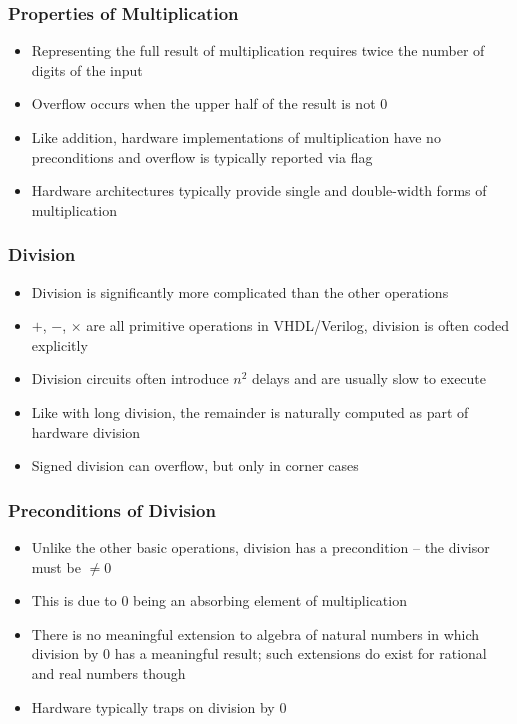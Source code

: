 \documentclass[aspectratio=169]{beamer}
\newif\iftransitions
\begin{document}
\begin{frame}
  \frametitle{Properties of Multiplication}
  
  \begin{itemize}
  \item Representing the full result of multiplication requires twice the number of digits of the input  \iftransitions \pause \fi 
  \item Overflow occurs when the upper half of the result is not $0$  \iftransitions \pause \fi 
  \item Like addition, hardware implementations of multiplication have no preconditions and overflow is typically reported via flag  \iftransitions \pause \fi 
  \item Hardware architectures typically provide single and double-width forms of multiplication
  \end{itemize}
\end{frame}

\begin{frame}
  \frametitle{Division}
  
  \begin{itemize}
  \item Division is significantly more complicated than the other operations  \iftransitions \pause \fi 
  \item $+$, $-$, $\times$ are all primitive operations in VHDL/Verilog, division is often coded explicitly  \iftransitions \pause \fi 
  \item Division circuits often introduce $n^2$ delays and are usually slow to execute  \iftransitions \pause \fi 
  \item Like with long division, the remainder is naturally computed as part of hardware division  \iftransitions \pause \fi 
  \item Signed division can overflow, but only in corner cases
  \end{itemize}
\end{frame}

\begin{frame}
  \frametitle{Preconditions of Division}
  
  \begin{itemize}
  \item Unlike the other basic operations, division has a precondition -- the divisor must be $\neq 0$  \iftransitions \pause \fi 
  \item This is due to $0$ being an absorbing element of multiplication  \iftransitions \pause \fi 
  \item There is no meaningful extension to algebra of natural numbers in which division by 0 has a meaningful result; such extensions do exist for rational and real numbers though  \iftransitions \pause \fi 
  \item Hardware typically traps on division by 0
  \end{itemize}
\end{frame}
\end{document}
